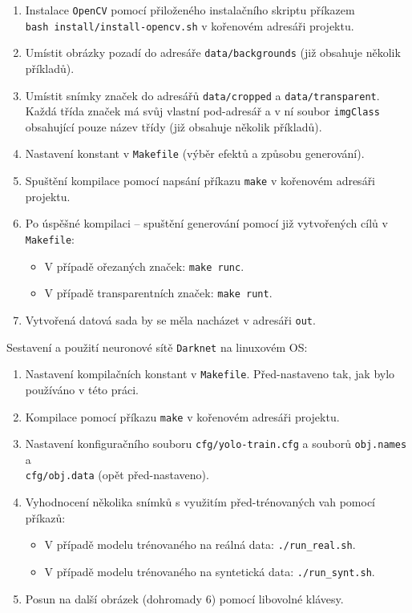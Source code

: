 \begin{enumerate}
    \item Instalace \texttt{OpenCV} pomocí přiloženého instalačního skriptu příkazem\\ \texttt{bash install/install-opencv.sh} v kořenovém adresáři projektu.
    \item Umístit obrázky pozadí do adresáře \texttt{data/backgrounds} (již obsahuje několik příkladů).
    \item Umístit snímky značek do adresářů \texttt{data/cropped} a \texttt{data/transparent}. Každá třída značek má svůj vlastní pod-adresář a v ní soubor \texttt{imgClass} obsahující pouze název třídy (již obsahuje několik příkladů).
    \item Nastavení konstant v \texttt{Makefile} (výběr efektů a způsobu generování).
    \item Spuštění kompilace pomocí napsání příkazu \texttt{make} v kořenovém adresáři projektu.
    \item Po úspěšné kompilaci -- spuštění generování pomocí již vytvořených cílů v \texttt{Makefile}:
    \begin{itemize}
        \item V případě ořezaných značek: \texttt{make runc}.
        \item V případě transparentních značek: \texttt{make runt}.
    \end{itemize}
    \item Vytvořená datová sada by se měla nacházet v adresáři \texttt{out}.
\end{enumerate}
Sestavení a použití neuronové sítě \texttt{Darknet} na linuxovém OS:

\begin{enumerate}
    \item Nastavení kompilačních konstant v \texttt{Makefile}. Před-nastaveno tak, jak bylo používáno v této práci.
    \item Kompilace pomocí příkazu \texttt{make} v kořenovém adresáři projektu.
    \item Nastavení konfiguračního souboru \texttt{cfg/yolo-train.cfg} a souborů \texttt{obj.names} a\\ \texttt{cfg/obj.data} (opět před-nastaveno).
    \item Vyhodnocení několika snímků s využitím před-trénovaných vah pomocí příkazů:
    \begin{itemize}
        \item V případě modelu trénovaného na reálná data: \texttt{./run\_real.sh}.
        \item V případě modelu trénovaného na syntetická data: \texttt{./run\_synt.sh}.
    \end{itemize}
    \item Posun na další obrázek (dohromady 6) pomocí libovolné klávesy.
\end{enumerate}

